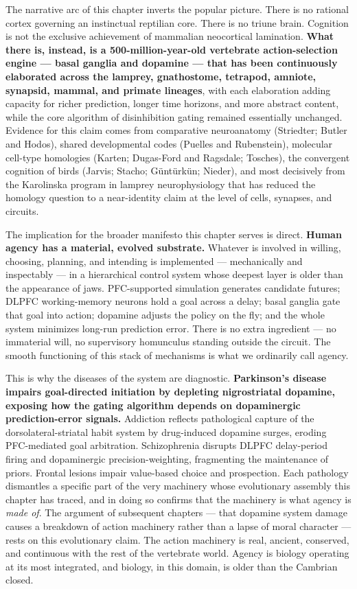 The narrative arc of this chapter inverts the popular picture. There is no rational cortex governing an instinctual reptilian core. There is no triune brain. Cognition is not the exclusive achievement of mammalian neocortical lamination. \textbf{What there is, instead, is a 500-million-year-old vertebrate action-selection engine --- basal ganglia and dopamine --- that has been continuously elaborated across the lamprey, gnathostome, tetrapod, amniote, synapsid, mammal, and primate lineages}, with each elaboration adding capacity for richer prediction, longer time horizons, and more abstract content, while the core algorithm of disinhibition gating remained essentially unchanged. Evidence for this claim comes from comparative neuroanatomy (Striedter; Butler and Hodos), shared developmental codes (Puelles and Rubenstein), molecular cell-type homologies (Karten; Dugas-Ford and Ragsdale; Tosches), the convergent cognition of birds (Jarvis; Stacho; Güntürkün; Nieder), and most decisively from the Karolinska program in lamprey neurophysiology that has reduced the homology question to a near-identity claim at the level of cells, synapses, and circuits.

The implication for the broader manifesto this chapter serves is direct. \textbf{Human agency has a material, evolved substrate.} Whatever is involved in willing, choosing, planning, and intending is implemented --- mechanically and inspectably --- in a hierarchical control system whose deepest layer is older than the appearance of jaws. PFC-supported simulation generates candidate futures; DLPFC working-memory neurons hold a goal across a delay; basal ganglia gate that goal into action; dopamine adjusts the policy on the fly; and the whole system minimizes long-run prediction error. There is no extra ingredient --- no immaterial will, no supervisory homunculus standing outside the circuit. The smooth functioning of this stack of mechanisms is what we ordinarily call agency.

This is why the diseases of the system are diagnostic. \textbf{Parkinson's disease impairs goal-directed initiation by depleting nigrostriatal dopamine, exposing how the gating algorithm depends on dopaminergic prediction-error signals.} Addiction reflects pathological capture of the dorsolateral-striatal habit system by drug-induced dopamine surges, eroding PFC-mediated goal arbitration. Schizophrenia disrupts DLPFC delay-period firing and dopaminergic precision-weighting, fragmenting the maintenance of priors. Frontal lesions impair value-based choice and prospection. Each pathology dismantles a specific part of the very machinery whose evolutionary assembly this chapter has traced, and in doing so confirms that the machinery is what agency is \emph{made of}. The argument of subsequent chapters --- that dopamine system damage causes a breakdown of action machinery rather than a lapse of moral character --- rests on this evolutionary claim. The action machinery is real, ancient, conserved, and continuous with the rest of the vertebrate world. Agency is biology operating at its most integrated, and biology, in this domain, is older than the Cambrian closed.

